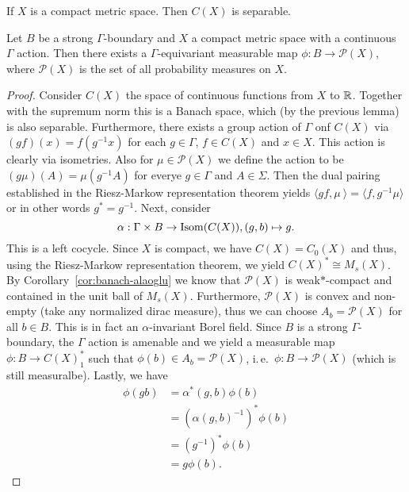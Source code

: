 \begin{lemma}
  If \(X\) is a compact metric space. Then \(C(X)\) is separable.
\end{lemma}

\begin{thm}
  Let \(B\) be a strong \(\Gamma\)-boundary and \(X\) a compact metric space with a continuous \(\Gamma\) action. Then there exists a \(\Gamma\)-equivariant measurable map \(\phi \colon B \to \mathcal{P}(X)\), where \(\mathcal{P}(X)\) is the set of all probability measures on \(X\).
\end{thm}

\begin{proof}
  Consider \(C(X)\) the space of continuous functions from \(X\) to \(\mathbb{R}\). Together with the supremum norm this is a Banach space, which (by the previous lemma) is also separable. Furthermore, there exists a group action of \(\Gamma\) onf \(C(X)\) via \((gf)(x) = f(g^{-1}x)\) for each \(g \in \Gamma\), \(f \in C(X)\) and \(x \in X\). This action is clearly via isometries. Also for \(\mu \in \mathcal{P}(X)\) we define the action to be \((g\mu)(A) = \mu(g^{-1} A)\) for everye \(g \in \Gamma\) and \(A \in \Sigma\). Then the dual pairing established in the Riesz-Markow representation theorem yields \(\langle gf, \mu\ \rangle = \langle f, g^{-1} \mu \rangle\) or in other words \(g^\ast = g^{-1}\).
  Next, consider
  \[
    \alpha: \Gamma \times B \to \operatorname{Isom}(C(X)), (g, b) \mapsto g.
  \]
  This is a left cocycle.
  Since \(X\) is compact, we have \(C(X) = C_0(X)\) and thus, using the Riesz-Markow representation theorem, we yield \(C(X)^\ast \cong M_{s}(X)\). By Corollary~\ref{cor:banach-alaoglu} we know that \(\mathcal{P}(X)\) is weak\(\ast\)-compact and contained in the unit ball of \(M_s(X)\). Furthermore, \(\mathcal{P}(X)\) is convex and non-empty (take any normalized dirac measure), thus we can choose \(A_b = \mathcal{P}(X)\) for all \(b \in B\). This is in fact an \(\alpha\)-invariant Borel field. Since \(B\) is a strong \(\Gamma\)-boundary, the \(\Gamma\) action is amenable and we yield a measurable map \(\phi \colon B \to C(X)^\ast_1\) such that \(\phi(b) \in A_b = \mathcal{P}(X)\), i.\,e.\ \(\phi \colon B \to \mathcal{P}(X)\) (which is still measuralbe). Lastly, we have
  \begin{align*}
    \phi(gb) & = \alpha^\ast(g, b) \phi(b)\\
               & = \left(\alpha(g,b)^{-1}\right)^\ast \phi(b)\\
               & = \left ( g^{-1}\right)^\ast \phi(b)\\
               & = g\phi(b).
  \end{align*}
\end{proof}

